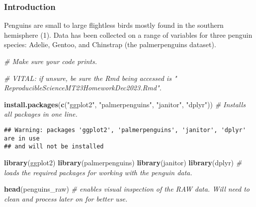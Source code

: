 \documentclass[
]{article}
\newenvironment{Shaded}{\begin{snugshade}}{\end{snugshade}}
\newcommand{\CommentTok}[1]{\textcolor[rgb]{0.56,0.35,0.01}{\textit{#1}}}
\newcommand{\FunctionTok}[1]{\textcolor[rgb]{0.13,0.29,0.53}{\textbf{#1}}}
\newcommand{\NormalTok}[1]{#1}
\newcommand{\StringTok}[1]{\textcolor[rgb]{0.31,0.60,0.02}{#1}}
\begin{document}
\hypertarget{introduction}{%
\subsubsection{Introduction}\label{introduction}}

Penguins are small to large flightless birds mostly found in the
southern hemisphere (1). Data has been collected on a range of variables
for three penguin species: Adelie, Gentoo, and Chinstrap (the
palmerpenguins dataset).

\begin{Shaded}
\begin{Highlighting}[]
\CommentTok{\# Make sure your code prints. }

\CommentTok{\# VITAL: if unsure, be sure  the Rmd being accessed is " ReproducibleScienceMT23HomeworkDec2023.Rmd". }

\FunctionTok{install.packages}\NormalTok{(}\FunctionTok{c}\NormalTok{(}\StringTok{"ggplot2"}\NormalTok{, }\StringTok{"palmerpenguins"}\NormalTok{, }\StringTok{"janitor"}\NormalTok{, }\StringTok{"dplyr"}\NormalTok{)) }\CommentTok{\# Installs all packages in one line. }
\end{Highlighting}
\end{Shaded}

\begin{verbatim}
## Warning: packages 'ggplot2', 'palmerpenguins', 'janitor', 'dplyr' are in use
## and will not be installed
\end{verbatim}

\begin{Shaded}
\begin{Highlighting}[]
\FunctionTok{library}\NormalTok{(ggplot2)}
\FunctionTok{library}\NormalTok{(palmerpenguins)}
\FunctionTok{library}\NormalTok{(janitor)}
\FunctionTok{library}\NormalTok{(dplyr) }\CommentTok{\# loads the required packages for working with the penguin data.}

\FunctionTok{head}\NormalTok{(penguins\_raw) }\CommentTok{\# enables visual inspection of the RAW data. Will need to clean and process later on for better use.}
\end{Highlighting}
\end{Shaded}
\end{document}
